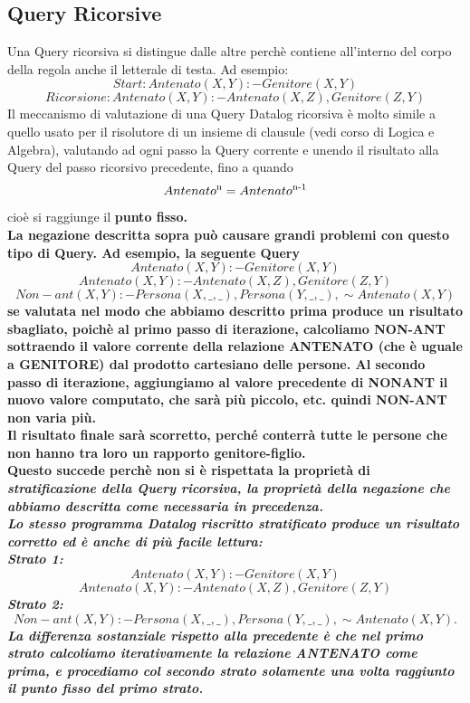 \documentclass[11pt]{article} %
\begin{document}
\subsection{Query Ricorsive}
Una Query ricorsiva si distingue dalle altre perchè contiene all'interno del corpo della regola anche il letterale di testa. Ad esempio: $$ Start: Antenato(X,Y) :- Genitore(X,Y) $$
$$ Ricorsione: Antenato(X,Y) :- Antenato(X,Z), Genitore(Z,Y) $$
Il meccanismo di valutazione di una Query Datalog ricorsiva è molto simile a quello usato per il risolutore di un insieme di clausule (vedi corso di Logica e Algebra), valutando ad ogni passo la Query corrente e unendo il risultato alla Query del passo ricorsivo precedente, fino a quando $$ Antenato \textsuperscript{n} = Antenato \textsuperscript{n-1}  $$cioè si raggiunge il \bf punto fisso\rm.\\
La negazione descritta sopra può causare grandi problemi con questo tipo di Query. Ad esempio, la seguente Query
$$ Antenato(X,Y) :- Genitore(X,Y) $$
$$ Antenato(X,Y) :- Antenato(X,Z),Genitore(Z,Y) $$
$$ Non-ant (X,Y) :- Persona(X,\_,\_), Persona (Y,\_,\_), \sim Antenato(X,Y) $$
se valutata nel modo che abbiamo descritto prima produce un risultato sbagliato, poichè al primo passo di iterazione, calcoliamo NON-ANT sottraendo il valore corrente della relazione ANTENATO (che è uguale a GENITORE) dal prodotto cartesiano delle persone. Al secondo passo di iterazione, aggiungiamo al valore precedente di  NONANT il nuovo valore computato, che sarà \bf più piccolo\rm, etc. quindi NON-ANT non varia più. \\
Il risultato finale sarà scorretto, perché conterrà tutte  le persone che non hanno tra loro un rapporto genitore-figlio. \\
Questo succede perchè non si è rispettata la proprietà di \it stratificazione \rm della Query ricorsiva, la proprietà della negazione che abbiamo descritta come necessaria in precedenza.\\
Lo stesso programma Datalog riscritto stratificato produce un risultato corretto ed è anche di più facile lettura:\\
Strato 1: 
$$Antenato(X,Y) :- Genitore(X,Y)$$
$$Antenato(X,Y) :- Antenato(X,Z),Genitore(Z,Y)$$
Strato 2:
$$Non-ant (X,Y) :- Persona(X,\_,\_), Persona (Y,\_,\_), \sim Antenato(X,Y).$$
La differenza sostanziale rispetto alla precedente è che nel primo strato calcoliamo iterativamente la relazione ANTENATO come prima, e procediamo col secondo strato solamente una volta raggiunto il punto fisso del primo strato.\\
\end{document}
